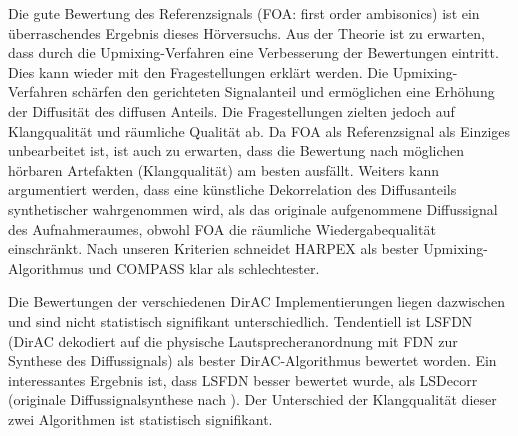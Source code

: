 Die gute Bewertung des Referenzsignals (FOA: first order ambisonics) ist ein überraschendes Ergebnis dieses Hörversuchs. Aus der Theorie ist zu erwarten, dass durch die Upmixing-Verfahren eine Verbesserung der Bewertungen eintritt. Dies kann wieder mit den Fragestellungen erklärt werden. Die Upmixing-Verfahren schärfen den gerichteten Signalanteil und ermöglichen eine Erhöhung der Diffusität des diffusen Anteils. Die Fragestellungen zielten jedoch auf Klangqualität und räumliche Qualität ab. Da FOA als Referenzsignal als Einziges unbearbeitet ist, ist auch zu erwarten, dass die Bewertung nach möglichen hörbaren Artefakten (Klangqualität) am besten ausfällt. Weiters kann argumentiert werden, dass eine künstliche Dekorrelation des Diffusanteils synthetischer wahrgenommen wird, als das originale aufgenommene Diffussignal des Aufnahmeraumes, obwohl FOA die räumliche Wiedergabequalität einschränkt.
Nach unseren Kriterien schneidet HARPEX als bester Upmixing-Algorithmus und COMPASS klar als schlechtester.

Die Bewertungen der verschiedenen DirAC Implementierungen liegen dazwischen und sind nicht statistisch signifikant unterschiedlich. Tendentiell ist LSFDN (DirAC dekodiert auf die physische Lautsprecheranordnung mit FDN zur Synthese des Diffussignals) als bester DirAC-Algorithmus bewertet worden.
Ein interessantes Ergebnis ist, dass LSFDN besser bewertet wurde, als LSDecorr (originale Diffussignalsynthese nach \cite{pulkki}). Der Unterschied der Klangqualität dieser zwei Algorithmen ist statistisch signifikant.
